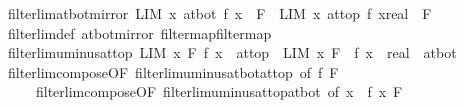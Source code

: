 \begin{isabellebody}
%
\isadelimproof
\isanewline
%
\endisadelimproof
\isanewline
{}\isamarkupfalse%
\ filterlim{\isacharunderscore}{\kern0pt}at{\isacharunderscore}{\kern0pt}bot{\isacharunderscore}{\kern0pt}mirror{\isacharcolon}{\kern0pt}\ {\isachardoublequoteopen}{\isacharparenleft}{\kern0pt}LIM\ x\ at{\isacharunderscore}{\kern0pt}bot{\isachardot}{\kern0pt}\ f\ x\ {\isacharcolon}{\kern0pt}{\isachargreater}{\kern0pt}\ F{\isacharparenright}{\kern0pt}\ {\isasymlongleftrightarrow}\ {\isacharparenleft}{\kern0pt}LIM\ x\ at{\isacharunderscore}{\kern0pt}top{\isachardot}{\kern0pt}\ f\ {\isacharparenleft}{\kern0pt}{\isacharminus}{\kern0pt}x{\isacharcolon}{\kern0pt}{\isacharcolon}{\kern0pt}real{\isacharparenright}{\kern0pt}\ {\isacharcolon}{\kern0pt}{\isachargreater}{\kern0pt}\ F{\isacharparenright}{\kern0pt}{\isachardoublequoteclose}\isanewline
%
\isadelimproof
\ \ %
\endisadelimproof
%
\isatagproof
{}\isamarkupfalse%
\ filterlim{\isacharunderscore}{\kern0pt}def\ at{\isacharunderscore}{\kern0pt}bot{\isacharunderscore}{\kern0pt}mirror\ filtermap{\isacharunderscore}{\kern0pt}filtermap\ \isacommand{{\isachardot}{\kern0pt}{\isachardot}{\kern0pt}}\isamarkupfalse%
%
\endisatagproof
{\isafoldproof}%
%
\isadelimproof
\isanewline
%
\endisadelimproof
\isanewline
{}\isamarkupfalse%
\ filterlim{\isacharunderscore}{\kern0pt}uminus{\isacharunderscore}{\kern0pt}at{\isacharunderscore}{\kern0pt}top{\isacharcolon}{\kern0pt}\ {\isachardoublequoteopen}{\isacharparenleft}{\kern0pt}LIM\ x\ F{\isachardot}{\kern0pt}\ f\ x\ {\isacharcolon}{\kern0pt}{\isachargreater}{\kern0pt}\ at{\isacharunderscore}{\kern0pt}top{\isacharparenright}{\kern0pt}\ {\isasymlongleftrightarrow}\ {\isacharparenleft}{\kern0pt}LIM\ x\ F{\isachardot}{\kern0pt}\ {\isacharminus}{\kern0pt}\ {\isacharparenleft}{\kern0pt}f\ x{\isacharparenright}{\kern0pt}\ {\isacharcolon}{\kern0pt}{\isacharcolon}{\kern0pt}\ real\ {\isacharcolon}{\kern0pt}{\isachargreater}{\kern0pt}\ at{\isacharunderscore}{\kern0pt}bot{\isacharparenright}{\kern0pt}{\isachardoublequoteclose}\isanewline
%
\isadelimproof
\ \ %
\endisadelimproof
%
\isatagproof
{}\isamarkupfalse%
\ filterlim{\isacharunderscore}{\kern0pt}compose{\isacharbrackleft}{\kern0pt}OF\ filterlim{\isacharunderscore}{\kern0pt}uminus{\isacharunderscore}{\kern0pt}at{\isacharunderscore}{\kern0pt}bot{\isacharunderscore}{\kern0pt}at{\isacharunderscore}{\kern0pt}top{\isacharcomma}{\kern0pt}\ of\ f\ F{\isacharbrackright}{\kern0pt}\isanewline
\ \ \ \ \ filterlim{\isacharunderscore}{\kern0pt}compose{\isacharbrackleft}{\kern0pt}OF\ filterlim{\isacharunderscore}{\kern0pt}uminus{\isacharunderscore}{\kern0pt}at{\isacharunderscore}{\kern0pt}top{\isacharunderscore}{\kern0pt}at{\isacharunderscore}{\kern0pt}bot{\isacharcomma}{\kern0pt}\ of\ {\isachardoublequoteopen}{\isasymlambda}x{\isachardot}{\kern0pt}\ {\isacharminus}{\kern0pt}\ f\ x{\isachardoublequoteclose}\ F{\isacharbrackright}{\kern0pt}\isanewline

\end{isabellebody}
